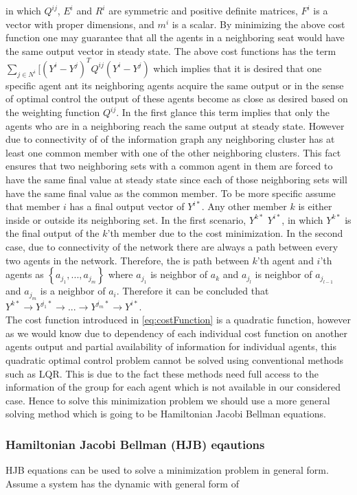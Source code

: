 \documentclass[conference]{IEEEtran}
\begin{document}
in which $Q^{ij}$, $E^{i}$ and $R^{i}$ are symmetric and positive definite matrices, $F^{i}$ is a vector with proper dimensions, and $m^{i}$ is a scalar. By minimizing the above cost function one may guarantee that all the agents in a neighboring seat would have the same output vector in steady state. The above cost functions has the term $\sum_{j \in N^{i}}[(Y^{i}-Y^{j})^{T}Q^{ij}(Y^{i}-Y^{j})$ which implies that it is desired that one specific agent ant its neighboring agents acquire the same output or in the sense of optimal control the output of these agents become as close as desired based on the weighting function $Q^{ij}$. In the first glance this term implies that only the agents who are in a neighboring reach the same output at steady state. However due to connectivity of of the information graph any neighboring cluster has at least one common member with one of the other neighboring clusters. This fact ensures that two neighboring sets with a common agent in them are forced to have the same final value at steady state since each of those neighboring sets will have the same final value as the common member. To be more specific assume that member $i$ has a final output vector of $Y^{i*}$. Any other member $k$ is either inside or outside its neighboring set. In the first scenario, $Y^{k*}$ \to $Y^{i*}$, in which $Y^{k*}$ is the final output of the $k$'th member due to the cost minimization. In the second case, due to connectivity of the network there are always a path between every two agents in the network. Therefore, the is path between $k$'th agent and $i$'th agents as $\left\{a_{j_{1}},...,a_{j_{m}}\right\}$ where $a_{j_{1}}$ is neighbor of $a_{k}$ and $a_{j_{l}}$ is neighbor of $a_{j_{l-1}}$ and $a_{j_{m}}$ is a neighbor of $a_{i}$. Therefore it can be concluded that $Y^{k*} \to Y^{j_{1}*} \to ... \to Y^{j_{m}*} \to Y^{i*}$.\\
The cost function introduced in \ref{eq:costFunction} is a quadratic function, however as we would know due to dependency of each individual cost function on another agents output and partial availability of information for individual agents, this quadratic optimal control problem cannot be solved using conventional methods such as LQR. This is due to the fact these methods need full access to the information of the group for each agent which is not available in our considered case. Hence to solve this minimization problem we should use a more general solving method which is going to be Hamiltonian Jacobi Bellman equations.

\subsubsection{Hamiltonian Jacobi Bellman (HJB) eqautions}
HJB equations can be used to solve a minimization problem in general form. Assume a system has the dynamic with general form of
\end{document}

